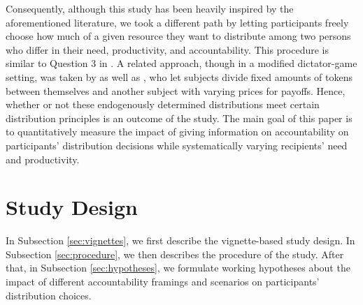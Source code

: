 \documentclass[smallcondensed]{svjour3}
\begin{document}
%
Consequently, although this study has been heavily inspired by the aforementioned literature, we took a different path by letting participants freely choose how much of a given resource they want to distribute among two persons who differ in their need, productivity, and accountability. This procedure is similar to Question 3 in \citet{konow_is_2009}. A related approach, though in a modified dictator-game setting, was taken by \citet{andreoni_giving_2002} as well as \citet{fisman_individual_2007}, who let subjects divide fixed amounts of tokens between themselves and another subject with varying prices for payoffs. Hence, whether or not these endogenously determined distributions meet certain distribution principles is an outcome of the study. The main goal of this paper is to quantitatively measure the impact of giving information on accountability on participants' distribution decisions while systematically varying recipients' need and productivity.\par
%
\section{Study Design}\label{sec:design}
%
In Subsection \ref{sec:vignettes}, we first describe the vignette-based study design. In Subsection \ref{sec:procedure}, we then describes the procedure of the study. After that, in Subsection \ref{sec:hypotheses}, we formulate working hypotheses about the impact of different accountability framings and scenarios on participants' distribution choices.\par
%
\end{document}
